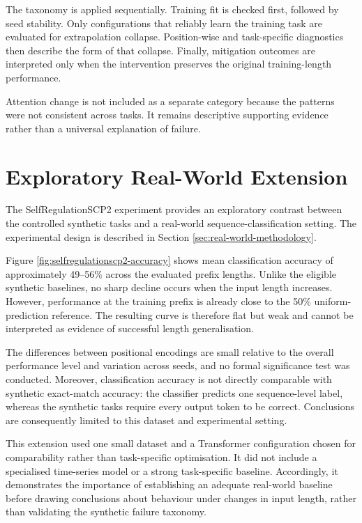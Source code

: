 \documentclass[
    author={Aanchala Ravindra Bhongade},
    supervisor={Dr. Fernando Moreno-Pino},
    degree={MSc},
    title={Length Generalisation in Transformer-Based Sequence Models: Failure Taxonomy and Mitigation Strategies},
    subtitle={},
    type={},
    year={2026}
]{dissertation}
\begin{document}
The taxonomy is applied sequentially. Training fit is checked first, followed by seed stability. Only configurations that reliably learn the training task are evaluated for extrapolation collapse. Position-wise and task-specific diagnostics then describe the form of that collapse. Finally, mitigation outcomes are interpreted only when the intervention preserves the original training-length performance.

Attention change is not included as a separate category because the patterns were not consistent across tasks. It remains descriptive supporting evidence rather than a universal explanation of failure.

\section{Exploratory Real-World Extension}
\label{sec:real-world-extension}

The SelfRegulationSCP2 experiment provides an exploratory contrast between the controlled synthetic tasks and a real-world sequence-classification setting. The experimental design is described in
Section \ref{sec:real-world-methodology}.

Figure \ref{fig:selfregulationscp2-accuracy} shows mean classification accuracy of approximately 49--56\% across the evaluated prefix lengths. Unlike the eligible synthetic baselines, no sharp decline occurs when the input length increases. However, performance at the training prefix is already close to the 50\% uniform-prediction reference. The resulting curve is therefore flat but weak and cannot be interpreted as evidence of successful length generalisation.

The differences between positional encodings are small relative to the overall performance level and variation across seeds, and no formal significance test was conducted. Moreover, classification accuracy is not directly comparable with synthetic exact-match accuracy: the classifier predicts one sequence-level label, whereas the synthetic tasks require every output token to be correct. Conclusions are consequently limited to this dataset and experimental setting.

This extension used one small dataset and a Transformer configuration chosen for comparability rather than task-specific optimisation. It did not include a specialised time-series model or a strong task-specific baseline. Accordingly, it demonstrates the importance of establishing an adequate real-world baseline before drawing conclusions about behaviour under changes in input length, rather than validating the synthetic failure taxonomy.
\end{document}
